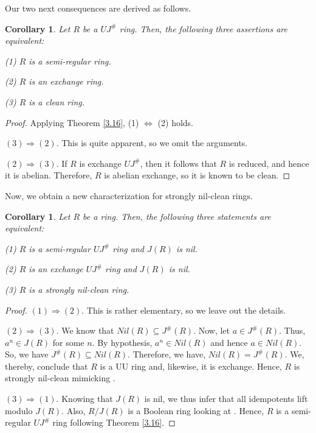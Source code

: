 \documentclass[12pt]{amsart}
\newtheorem{corollary}[theorem]{Corollary}
\theoremstyle{definition}
\begin{document}
Our two next consequences are derived as follows.

\begin{corollary}\label{3.17}
Let \( R \) be a $UJ^{\#}$ ring. Then, the following three assertions are equivalent:

(1) \( R \) is a semi-regular ring.

(2) \( R \) is an exchange ring.

(3) \( R \) is a clean ring.
\end{corollary}

\begin{proof}
Applying Theorem \ref{3.16}, (1) \(\Leftrightarrow\) (2) holds.
	
\((3) \Rightarrow (2)\). This is quite apparent, so we omit the arguments.
	
\((2) \Rightarrow (3)\). If \( R \) is exchange $UJ^{\#}$, then it follows that \( R \) is reduced, and hence it is abelian. Therefore, \( R \) is abelian exchange, so it is known to be clean.
\end{proof}

Now, we obtain a new characterization for strongly nil-clean rings.

\begin{corollary}\label{3.18}
Let \( R \) be a ring. Then, the following three statements are equivalent:

(1) \( R \) is a semi-regular $UJ^{\#}$ ring and \(J(R)\) is nil.

(2) \( R \) is an exchange $UJ^{\#}$ ring and \(J(R)\) is nil.

(3) \( R \) is a strongly nil-clean ring.
\end{corollary}

\begin{proof}
\((1) \Rightarrow (2)\). This is rather elementary, so we leave out the details.
	
\((2) \Rightarrow (3)\). We know that $Nil(R)\subseteq J^{\#}(R)$. Now, let $a\in J^{\#}(R)$. Thus, $a^n \in J(R)$ for some $n$. By hypothesis, $a^n\in Nil(R)$ and hence $a\in Nil(R)$. So, we have $J^{\#}(R) \subseteq Nil(R)$. Therefore, we have, $Nil(R)=J^{\#}(R)$. We, thereby, conclude that $R$ is a UU ring and, likewise, it is exchange. Hence, $R$ is strongly nil-clean mimicking \cite[Theorem 3.8]{DL}.
	
\((3) \Rightarrow (1)\). Knowing that $J(R)$ is nil, we thus infer that all idempotents lift modulo $J(R)$. Also, $R/J(R)$ is a Boolean ring looking at \cite[Theorem 3.8]{DL}. Hence, $R$ is a semi-regular $UJ^{\#}$ ring following Theorem \ref{3.16}.
\end{proof}
\end{document}
